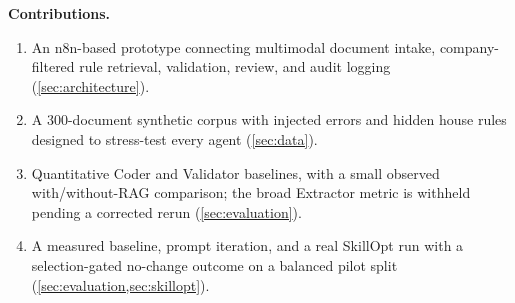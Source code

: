 \textbf{Contributions.}
\begin{enumerate}[leftmargin=*, itemsep=2pt]
  \item An n8n-based prototype connecting multimodal document intake,
        company-filtered rule retrieval, validation, review, and audit logging
        (\cref{sec:architecture}).
  \item A 300-document synthetic corpus with injected errors and hidden house
        rules designed to stress-test every agent (\cref{sec:data}).
  \item Quantitative Coder and Validator baselines, with a small observed
        with/without-RAG comparison; the broad Extractor metric is withheld
        pending a corrected rerun (\cref{sec:evaluation}).
  \item A measured baseline, prompt iteration, and a real SkillOpt run with a
        selection-gated no-change outcome on a balanced pilot split
        (\cref{sec:evaluation,sec:skillopt}).
\end{enumerate}
